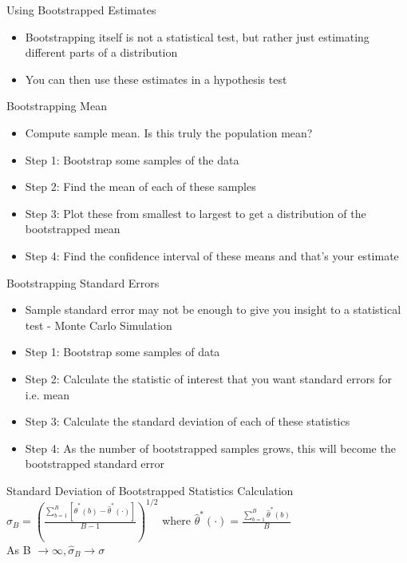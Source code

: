 \begin{frame}{Using Bootstrapped Estimates}
    \begin{itemize}
        \item Bootstrapping itself is not a statistical test, but rather just estimating different parts of a distribution
        \item You can then use these estimates in a hypothesis test
    \end{itemize}
\end{frame}

\begin{frame}{Bootstrapping Mean}
    \begin{itemize}
        \item Compute sample mean. Is this truly the population mean?
        \item Step 1: Bootstrap some samples of the data
        \item Step 2: Find the mean of each of these samples
        \item Step 3: Plot these from smallest to largest to get a distribution of the bootstrapped mean
        \item Step 4: Find the confidence interval of these means and that's your estimate
    \end{itemize}
\end{frame}

\begin{frame}{Bootstrapping Standard Errors}
    \begin{itemize}
        \item Sample standard error may not be enough to give you insight to a statistical test - Monte Carlo Simulation
        \item Step 1: Bootstrap some samples of data
        \item Step 2: Calculate the statistic of interest that you want standard errors for i.e. mean
        \item Step 3: Calculate the standard deviation of each of these statistics
        \item Step 4: As the number of bootstrapped samples grows, this will become the bootstrapped standard error
    \end{itemize}
\end{frame}

\begin{frame}{Standard Deviation of Bootstrapped Statistics Calculation}
\centering
    $\hat{\sigma}_B = (\frac{\sum_{b=1}^{B}[\hat{\theta}^*(b)-\hat{\theta}^*(\cdot)]}{B-1})^{1/2}$ where $\hat{\theta}^*(\cdot) = \frac{\sum_{b=1}^{B}\hat{\theta}^*(b)}{B}$ \\
    \vspace{0.25 in}
    As B $\rightarrow \infty, \hat{\sigma}_B \rightarrow \sigma$
\end{frame}

